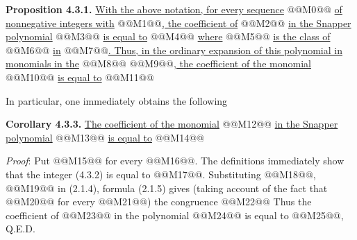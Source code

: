 
\textbf{Proposition 4.3.1.} \uline{With the above notation, for every sequence} @@M0@@ \uline{of nonnegative integers with} @@M1@@\uline{, the coefficient of}
@@M2@@
\uline{in the Snapper polynomial} @@M3@@ \uline{is equal to}
@@M4@@
\uline{where} @@M5@@ \uline{is the class of} @@M6@@ \uline{in} @@M7@@\uline{. Thus, in the ordinary expansion of this polynomial in monomials in the} @@M8@@ @@M9@@\uline{, the coefficient of the monomial} @@M10@@ \uline{is equal to}
@@M11@@

In particular, one immediately obtains the following

\textbf{Corollary 4.3.3.} \uline{The coefficient of the monomial} @@M12@@ \uline{in the Snapper polynomial} @@M13@@ \uline{is equal to}
@@M14@@

\emph{Proof}: Put @@M15@@ for every @@M16@@. The definitions immediately show that the integer (4.3.2) is equal to @@M17@@. Substituting @@M18@@, @@M19@@ in (2.1.4), formula (2.1.5) gives (taking account of the fact that @@M20@@ for every @@M21@@) the congruence
@@M22@@
Thus the coefficient of @@M23@@ in the polynomial @@M24@@ is equal to @@M25@@, Q.E.D.

